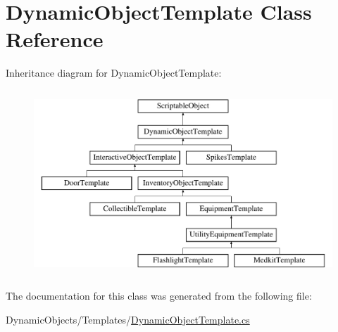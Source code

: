 \hypertarget{class_dynamic_object_template}{}\section{Dynamic\+Object\+Template Class Reference}
\label{class_dynamic_object_template}
Inheritance diagram for Dynamic\+Object\+Template\+:\begin{figure}[H]
\begin{center}
\leavevmode
\includegraphics[height=7.000000cm]{class_dynamic_object_template}
\end{center}
\end{figure}


The documentation for this class was generated from the following file\+:\begin{DoxyCompactItemize}
\item 
Dynamic\+Objects/\+Templates/\mbox{\hyperlink{_dynamic_object_template_8cs}{Dynamic\+Object\+Template.\+cs}}\end{DoxyCompactItemize}
